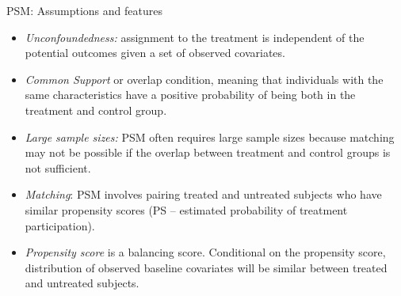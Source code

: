 \documentclass{beamer}
\begin{document}
\begin{frame}{PSM: Assumptions and features}
\begin{itemize}
    \item \emph{Unconfoundedness:} assignment to the treatment is independent of the potential outcomes given a set of observed covariates.
    \item \emph{Common Support} or overlap condition, meaning that individuals with the same characteristics have a positive probability of being both in the treatment and control group.
    \item \emph{Large sample sizes:} PSM often requires large sample sizes because matching may not be possible if the overlap between treatment and control groups is not sufficient.
    \bigskip
    \item \emph{Matching}: PSM involves pairing treated and untreated subjects who have similar propensity scores (PS -- estimated probability of treatment participation).
    \item \emph{Propensity score} is a balancing score. Conditional on the propensity score, distribution of observed baseline covariates will be similar between treated and untreated subjects.
\end{itemize}
\end{frame}
\end{document}
